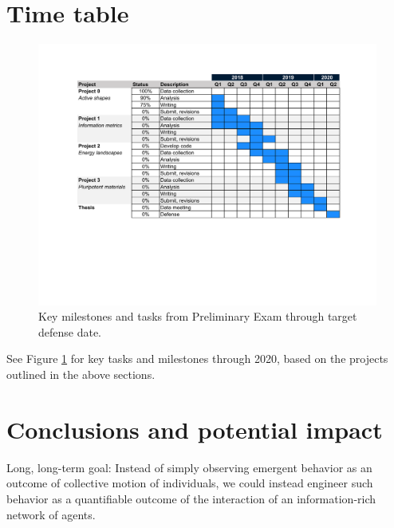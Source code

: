 \documentclass[12pt, oneside]{article}   	%
\begin{document}
\section{Time table}

\begin{figure}[t]
\begin{center}
\includegraphics[width=6.5in]{../figures/gantt.pdf}
\caption{Key milestones and tasks from Preliminary Exam through target defense date.}
\label{fig:gantt}
\end{center}
\end{figure}

See Figure \ref{fig:gantt} for key tasks and milestones through 2020, based on the projects outlined in the above sections.

\section{Conclusions and potential impact}
Long, long-term goal: Instead of simply observing emergent behavior as an outcome of collective motion of individuals, we could instead engineer such behavior as a quantifiable outcome of the interaction of an information-rich network of agents.


\newpage


\end{document}

